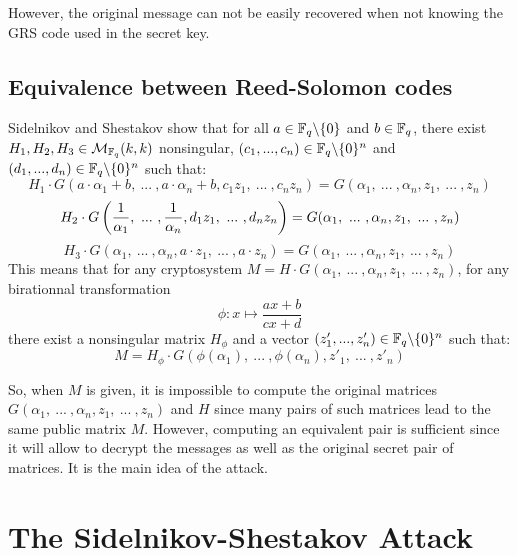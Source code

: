 \documentclass[a4paper]{article}
\begin{document}
However, the original message can not be easily recovered when not knowing the GRS code used in the secret key.

\subsection{Equivalence between Reed-Solomon codes}

Sidelnikov and Shestakov show \cite{SidelShes92} that for all $a \in \mathbb{F}_q\backslash\{0\}$ and $b \in \mathbb{F}_q$, there exist $H_1, H_2, H_3 \in \mathcal{M}_{\mathbb{F}_q}(k,k)$ nonsingular, $(c_1,... ,c_n) \in \mathbb{F}_q\backslash\{0\}^{n}$ and $(d_1,... ,d_n) \in \mathbb{F}_q\backslash\{0\}^{n}$ such that:
\begin{equation}
H_1\cdot G(a\cdot\alpha_1 + b, \ ... \ , a\cdot \alpha_n + b, c_1z_1, \ ... \ , c_n z_n) = G(\alpha_1, \ ... \ , \alpha_n, z_1, \ ... \ , z_n)
\label{eq1}
\end{equation}
\begin{equation}
H_2\cdot G\left( \frac{1}{\alpha_1}, \ ... \ , \frac{1}{\alpha_n}, d_1z_1, \ ... \ , d_n z_n \right) = G(\alpha_1, \ ... \ , \alpha_n, z_1, \ ... \ , z_n) \\
\label{eq2}
\end{equation}
\begin{equation}
H_3\cdot G\left( \alpha_1, \ ... \ , \alpha_n, a\cdot z_1, \ ... \ , a\cdot z_n \right) = G(\alpha_1, \ ... \ , \alpha_n, z_1, \ ... \ , z_n)
\label{eq3}
\end{equation}
This means that for any cryptosystem $M = H\cdot G(\alpha_1, \ ... \ , \alpha_n, z_1, \ ... \ , z_n)$, for any birationnal transformation
$$ \phi : x \mapsto \frac{ax+b}{cx+d}$$
there exist a nonsingular matrix $H_{\phi}$ and a vector $(z'_1,... ,z'_n) \in \mathbb{F}_q\backslash\{0\}^{n}$ such that:
\begin{equation}
 M = H_{\phi}\cdot G(\phi(\alpha_1), \ ... \ , \phi(\alpha_n), z'_1, \ ... \ , z'_n)
 \label{eq4}
\end{equation}


So, when $M$ is given, it is impossible to compute the original matrices $G(\alpha_1, \ ... \ , \alpha_n, z_1, \ ... \ , z_n)$ and $H$ since many pairs of such matrices lead to the same public matrix $M$.
However, computing an equivalent pair is sufficient since it will allow to decrypt the messages as well as the original secret pair of matrices.
It is the main idea of the attack.



\section{The Sidelnikov-Shestakov Attack}
\label{sec:SSattack}
\end{document}
